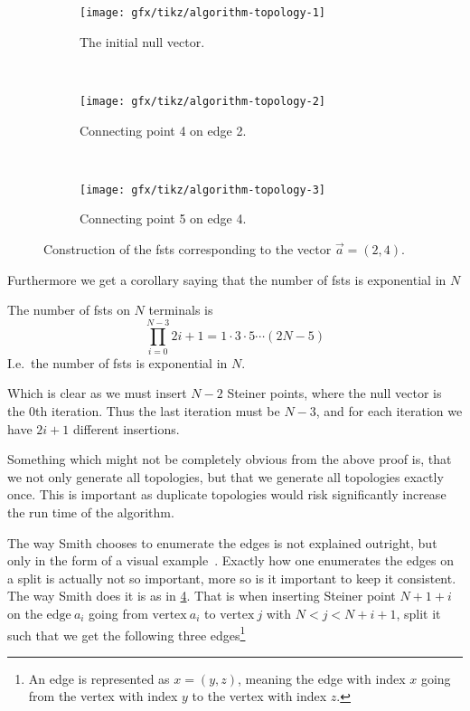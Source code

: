 \begin{figure}[htbp] \centering
  \begin{subfigure}[t]{0.267\textwidth}
    \texttt{[image: gfx/tikz/algorithm-topology-1]}
    \caption{The initial null vector.\label{fig:algorithm-topology-1}}
  \end{subfigure} ~
  \begin{subfigure}[t]{0.267\textwidth}
    \texttt{[image: gfx/tikz/algorithm-topology-2]}
    \caption{Connecting point 4 on edge 2.\label{fig:algorithm-topology-2}}
  \end{subfigure} ~
  \begin{subfigure}[t]{0.267\textwidth}
    \texttt{[image: gfx/tikz/algorithm-topology-3]}
    \caption{Connecting point 5 on edge 4.\label{fig:algorithm-topology-3}}
  \end{subfigure}
  \caption[Construction of FSTs]{Construction of the \glspl{fst} corresponding
to the vector $\vec{a} = (2, 4)$.\label{fig:algorithm-topologies}}
\end{figure}

Furthermore we get a corollary saying that the number of \glspl{fst} is
exponential in $N$

\begin{corollary}
\label{cor:number-of-fsts} The number of \glspl{fst} on $N$ terminals is
\[\prod_{i=0}^{N-3} 2i+1 = 1 \cdot 3 \cdot 5 \cdots (2N - 5)\] I.e.\ the number
of \glspl{fst} is exponential in $N$.
\end{corollary}

Which is clear as we must insert $N-2$ Steiner points, where the null vector is
the $0$th iteration. Thus the last iteration must be $N-3$, and for each
iteration we have $2i+1$ different insertions.

Something which might not be completely obvious from the above proof is, that we
not only generate all topologies, but that we generate all topologies exactly
once. This is important as duplicate topologies would risk significantly
increase the run time of the algorithm.


The way Smith chooses to enumerate the edges is not explained outright, but only
in the form of a visual example~\cite[p.~143]{smith1992}. Exactly how one
enumerates the edges on a split is actually not so important, more so is it
important to keep it consistent. The way Smith does it is as in
\cref{fig:algorithm-topologies}. That is when inserting Steiner point $N+1+i$
on the $\text{edge}~a_{i}$ going from $\text{vertex}~a_i$ to $\text{vertex}~j$
with $N < j < N+i+1$, split it such that we get the following three
edges\footnote{An edge is represented as $x = (y, z)$, meaning the edge with
  index $x$ going from the vertex with index $y$ to the vertex with index
  $z$.}

